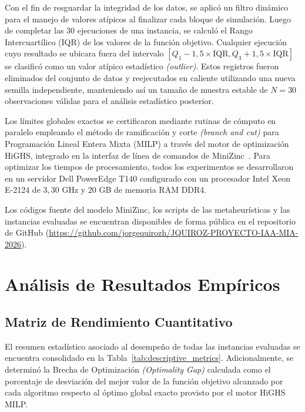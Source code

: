\documentclass[final,5p,times,twocolumn]{elsarticle}
\begin{document}
Con el fin de resguardar la integridad de los datos, se aplicó un filtro dinámico para el manejo de valores atípicos al finalizar cada bloque de simulación. Luego de completar las $30$ ejecuciones de una instancia, se calculó el Rango Intercuartílico (IQR) de los valores de la función objetivo. Cualquier ejecución cuyo resultado se ubicara fuera del intervalo $[Q_1 - 1,5 \times \text{IQR}, Q_3 + 1,5 \times \text{IQR}]$ se clasificó como un valor atípico estadístico \textit{(outlier)}. Estos registros fueron eliminados del conjunto de datos y reejecutados en caliente utilizando una nueva semilla independiente, manteniendo así un tamaño de muestra estable de $N=30$ observaciones válidas para el análisis estadístico posterior.

Los límites globales exactos se certificaron mediante rutinas de cómputo en paralelo empleando el método de ramificación y corte \textit{(branch and cut)} para Programación Lineal Entera Mixta (MILP) a través del motor de optimización HiGHS, integrado en la interfaz de línea de comandos de MiniZinc~\cite{nethercote2007minizinc}. Para optimizar los tiempos de procesamiento, todos los experimentos se desarrollaron en un servidor Dell PowerEdge T140 configurado con un procesador Intel Xeon E-2124 de $3,30$ GHz y $20$ GB de memoria RAM DDR4.

Los códigos fuente del modelo MiniZinc, los scripts de las metaheurísticas y las instancias evaluadas se encuentran disponibles de forma pública en el repositorio de GitHub (\url{https://github.com/jorgequirozh/JQUIROZ-PROYECTO-IAA-MIA-2026}).

\section{Análisis de Resultados Empíricos}
\label{sec:results}

\subsection{Matriz de Rendimiento Cuantitativo}
El resumen estadístico asociado al desempeño de todas las instancias evaluadas se encuentra consolidado en la Tabla~\ref{tab:descriptive_metrics}. Adicionalmente, se determinó la Brecha de Optimización \textit{(Optimality Gap)} calculada como el porcentaje de desviación del mejor valor de la función objetivo alcanzado por cada algoritmo respecto al óptimo global exacto provisto por el motor HiGHS MILP.
\end{document}
